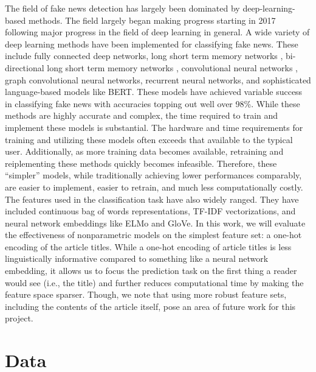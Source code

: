 \documentclass[12pt]{article}
\begin{document}
    The field of fake news detection has largely been dominated by deep-learning-based methods\cite{oshikawa:2020}. The field largely began making progress starting in 2017 following major progress in the field of deep learning in general\cite{bhatt:2017}. A wide variety of deep learning methods have been implemented for classifying fake news. These include fully connected deep networks\cite{thota:2018,saikh:2020}, long short term memory networks \cite{rodriguez:2019, kumar:2020}, bi-directional long short term memory networks \cite{popat:2018,qawasmeh:2019,abedalla:2019,kumar:2020}, convolutional neural networks \cite{rodriguez:2019, kumar:2020}, graph convolutional neural networks\cite{monti:2019}, recurrent neural networks\cite{girgis:2018, singhania:2017}, and sophisticated language-based models like BERT\cite{abedalla:2019, zellers:2019}. These models have achieved variable success in classifying fake news with accuracies topping out well over 98\%. While these methods are highly accurate and complex, the time required to train and implement these models is substantial. The hardware and time requirements for training and utilizing these models often exceeds that available to the typical user. Additionally, as more training data becomes available, retraining and reiplementing these methods quickly becomes infeasible. Therefore, these ``simpler'' models, while traditionally achieving lower performances comparably\cite{oshikawa:2020}, are easier to implement, easier to retrain, and much less computationally costly. The features used in the classification task have also widely ranged. They have included continuous bag of words representations, TF-IDF vectorizations, and neural network embeddings like ELMo and GloVe. In this work, we will evaluate the effectiveness of nonparametric models on the simplest feature set: a one-hot encoding of the article titles. While a one-hot encoding of article titles is less linguistically informative compared to something like a neural network embedding, it allows us to focus the prediction task on the first thing a reader would see (i.e., the title) and further reduces computational time by making the feature space sparser. Though, we note that using more robust feature sets, including the contents of the article itself, pose an area of future work for this project.
	
    \section{Data}
    
\end{document}
